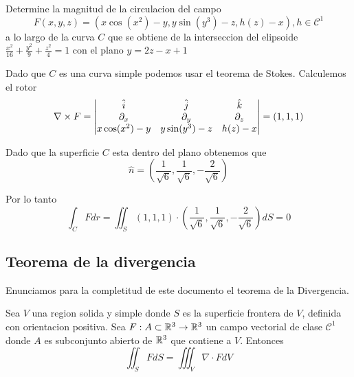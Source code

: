 \documentclass[../main.tex]{subfiles}
\begin{document}
\begin{problem}
  Determine la magnitud de la circulacion del campo
  \begin{equation*}
    F(x, y, z) = (x \cos(x^{2}) - y, y \sin(y^{3}) - z, h(z) - x), h \in \mathcal{C^{1}}
  \end{equation*}
  a lo largo de la curva $C$ que se obtiene de la interseccion del elipsoide $\frac{x^{2}}{16} + \frac{y^{2}}{9} + \frac{z^{2}}{4} = 1$ con el plano $y = 2z - x + 1$
\end{problem}
\begin{solution}
  Dado que $C$ es una curva simple podemos usar el teorema de Stokes. Calculemos el rotor
  \begin{equation*}
    \nabla \times F = \begin{vmatrix} \hat{i} & \hat{j} & \hat{k}\\ \partial_x & \partial_y & \partial_z\\ x \cos(x^{2}) - y & y \sin(y^{3}) - z & h(z) - x\end{vmatrix} = (1, 1, 1)
  \end{equation*}

  Dado que la superficie $C$ esta dentro del plano obtenemos que
  \begin{equation*}
    \hat{n} = (\frac{1}{\sqrt{6}}, \frac{1}{\sqrt{6}}, -\frac{2}{\sqrt{6}})
  \end{equation*}

  Por lo tanto
  \begin{equation*}
    \int_{C} F dr = \iint_{S} (1, 1, 1) \cdot (\frac{1}{\sqrt{6}}, \frac{1}{\sqrt{6}}, -\frac{2}{\sqrt{6}}) dS = 0
  \end{equation*}
\end{solution}

\subsection{Teorema de la divergencia}
Enunciamos para la completitud de este documento el teorema de la Divergencia.
\begin{teorema}[Divergencia]
  Sea $V$ una region solida y simple donde $S$ es la superficie frontera de $V$, definida con orientacion positiva. Sea $F: A \subset \mathbb{R}^{3} \to \mathbb{R}^{3}$ un campo vectorial de clase $\mathcal{C}^{1}$ donde $A$ es subconjunto abierto de $\mathbb{R}^{3}$ que contiene a $V$. Entonces
  \begin{equation*}
    \iint_{S} F dS = \iiint_{V} \nabla \cdot F dV
  \end{equation*}
\end{teorema}
\end{document}
